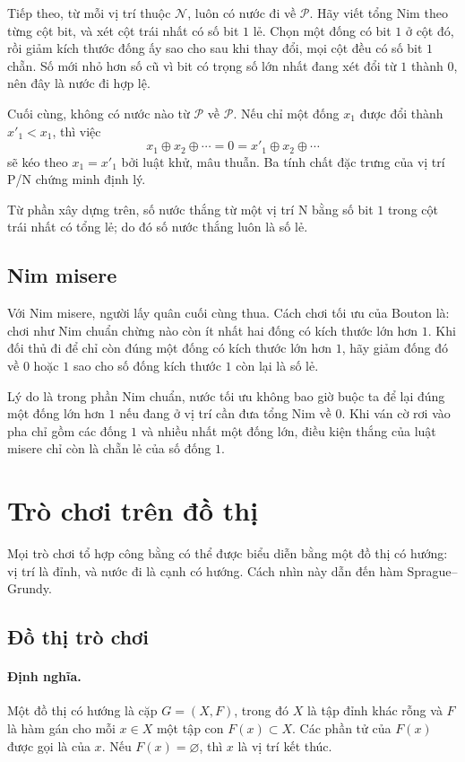 \documentclass[11pt]{article}
\newcommand{\xor}{\mathbin{\oplus}}
\begin{document}
Tiếp theo, từ mỗi vị trí thuộc \(\mathcal N\), luôn có nước đi về
\(\mathcal P\). Hãy viết tổng Nim theo từng cột bit, và xét cột trái nhất có
số bit \(1\) lẻ. Chọn một đống có bit \(1\) ở cột đó, rồi giảm kích thước đống
ấy sao cho sau khi thay đổi, mọi cột đều có số bit \(1\) chẵn. Số mới nhỏ hơn
số cũ vì bit có trọng số lớn nhất đang xét đổi từ \(1\) thành \(0\), nên đây
là nước đi hợp lệ.

Cuối cùng, không có nước nào từ \(\mathcal P\) về \(\mathcal P\). Nếu chỉ một
đống \(x_1\) được đổi thành \(x'_1<x_1\), thì việc
\[
  x_1\xor x_2\xor\cdots=0=x'_1\xor x_2\xor\cdots
\]
sẽ kéo theo \(x_1=x'_1\) bởi luật khử, mâu thuẫn. Ba tính chất đặc trưng của
vị trí P/N chứng minh định lý.

Từ phần xây dựng trên, số nước thắng từ một vị trí N bằng số bit \(1\) trong
cột trái nhất có tổng lẻ; do đó số nước thắng luôn là số lẻ.

\subsection{Nim misere}

Với Nim misere, người lấy quân cuối cùng thua. Cách chơi tối ưu của Bouton là:
chơi như Nim chuẩn chừng nào còn ít nhất hai đống có kích thước lớn hơn \(1\).
Khi đối thủ đi để chỉ còn đúng một đống có kích thước lớn hơn \(1\), hãy giảm
đống đó về \(0\) hoặc \(1\) sao cho số đống kích thước \(1\) còn lại là số lẻ.

Lý do là trong phần Nim chuẩn, nước tối ưu không bao giờ buộc ta để lại đúng
một đống lớn hơn \(1\) nếu đang ở vị trí cần đưa tổng Nim về \(0\). Khi ván cờ
rơi vào pha chỉ gồm các đống \(1\) và nhiều nhất một đống lớn, điều kiện thắng
của luật misere chỉ còn là chẵn lẻ của số đống \(1\).

\section{Trò chơi trên đồ thị}

Mọi trò chơi tổ hợp công bằng có thể được biểu diễn bằng một đồ thị có hướng:
vị trí là đỉnh, và nước đi là cạnh có hướng. Cách nhìn này dẫn đến hàm
Sprague--Grundy.

\subsection{Đồ thị trò chơi}

\paragraph{Định nghĩa.}
Một đồ thị có hướng là cặp \(G=(X,F)\), trong đó \(X\) là tập đỉnh khác rỗng
và \(F\) là hàm gán cho mỗi \(x\in X\) một tập con \(F(x)\subset X\). Các phần
tử của \(F(x)\) được gọi là  của \(x\). Nếu \(F(x)=\varnothing\),
thì \(x\) là vị trí kết thúc.
\end{document}
